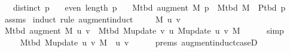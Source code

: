 \begin{isabellebody}
\ \ \ {\isachardoublequoteopen}distinct\ p{\isachardoublequoteclose}\isanewline
\ \ \ {\isachardoublequoteopen}even\ {\isacharparenleft}{\kern0pt}length\ p{\isacharparenright}{\kern0pt}{\isachardoublequoteclose}\isanewline
\ \ \ {\isachardoublequoteopen}M{\isacharunderscore}{\kern0pt}tbd\ {\isacharparenleft}{\kern0pt}augment\ M\ p{\isacharparenright}{\kern0pt}\ {\isacharequal}{\kern0pt}\ M{\isacharunderscore}{\kern0pt}tbd\ M\ {\isasymoplus}\ P{\isacharunderscore}{\kern0pt}tbd\ p{\isachardoublequoteclose}\isanewline
%
\isadelimproof
\ \ %
\endisadelimproof
%
\isatagproof
{}\isamarkupfalse%
\ assms\isanewline
{}\isamarkupfalse%
\ {\isacharparenleft}{\kern0pt}induct\ rule{\isacharcolon}{\kern0pt}\ augment{\isachardot}{\kern0pt}induct{\isacharparenright}{\kern0pt}\isanewline
\ \ \isamarkupfalse%
\ {\isacharparenleft}{\kern0pt}{}\ M\ u\ v{\isacharparenright}{\kern0pt}\isanewline
\ \ \isamarkupfalse%
\ {\isachardoublequoteopen}M{\isacharunderscore}{\kern0pt}tbd\ {\isacharparenleft}{\kern0pt}augment\ M\ {\isacharbrackleft}{\kern0pt}u{\isacharcomma}{\kern0pt}\ v{\isacharbrackright}{\kern0pt}{\isacharparenright}{\kern0pt}\ {\isacharequal}{\kern0pt}\ M{\isacharunderscore}{\kern0pt}tbd\ {\isacharparenleft}{\kern0pt}M{\isacharunderscore}{\kern0pt}update\ v\ u\ {\isacharparenleft}{\kern0pt}M{\isacharunderscore}{\kern0pt}update\ u\ v\ M{\isacharparenright}{\kern0pt}{\isacharparenright}{\kern0pt}{\isachardoublequoteclose}\isanewline
\ \ \ \ \isamarkupfalse%
\ simp\isanewline
\ \ \isamarkupfalse%
\ \isamarkupfalse%
\ {\isachardoublequoteopen}{\isachardot}{\kern0pt}{\isachardot}{\kern0pt}{\isachardot}{\kern0pt}\ {\isacharequal}{\kern0pt}\ M{\isacharunderscore}{\kern0pt}tbd\ {\isacharparenleft}{\kern0pt}M{\isacharunderscore}{\kern0pt}update\ u\ v\ M{\isacharparenright}{\kern0pt}\ {\isasymunion}\ {\isacharbraceleft}{\kern0pt}{\isacharbraceleft}{\kern0pt}u{\isacharcomma}{\kern0pt}\ v{\isacharbraceright}{\kern0pt}{\isacharbraceright}{\kern0pt}{\isachardoublequoteclose}\isanewline
\ \ \ \ \isamarkupfalse%
\ {\isachardoublequoteopen}{}{\isachardot}{\kern0pt}prems{\isachardoublequoteclose}\ augment{\isacharunderscore}{\kern0pt}induct{\isacharunderscore}{\kern0pt}case{\isacharunderscore}{\kern0pt}{}D{\isacharparenleft}{\kern0pt}{}{\isacharcomma}{\kern0pt}\ {}{\isacharparenright}{\kern0pt}\isanewline
\ \ \ \ \isamarkupfalse%

\end{isabellebody}
